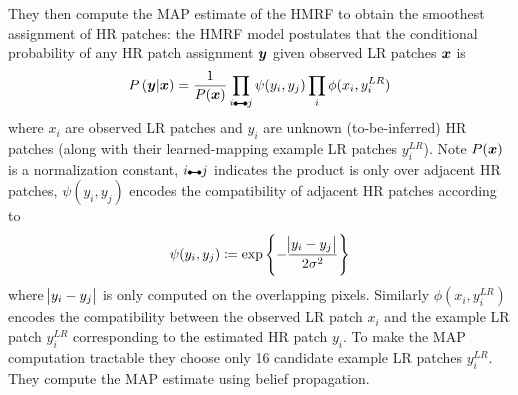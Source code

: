 %
They then compute the MAP estimate of the HMRF to obtain the smoothest assignment of HR patches: the HMRF model postulates that the conditional probability of any HR patch assignment \(\bm{y}\) given observed LR patches \(\bm{x}\) is
\begin{equation}
	P\left( \by \middle| \bx \right) = \frac{1}{P(\bx)} \prod_{i\ue{} j} \psi(y_i, y_j) \prod_i \phi(x_i, y_i^{LR})
\end{equation}
where \(x_i\) are observed LR patches and \(y_i\) are unknown (to-be-inferred) HR patches (along with their learned-mapping example LR patches \(y_i^{LR}\)).
%
Note \(P(\bm{x})\) is a normalization constant, \(i\ue{} j\) indicates the product is only over adjacent HR patches, \(\psi(y_i, y_j)\) encodes the compatibility of adjacent HR patches according to
\begin{equation}
	\psi(y_i, y_j) \coloneqq \exp \left\{ -  \frac{\abs{ y_i - y_j }}{2\sigma^2} \right\}
\end{equation}
where \(\abs{ y_i - y_j }\) is only computed on the overlapping pixels.
%
Similarly \(\phi(x_i, y_i^{LR})\) encodes the compatibility between the observed LR patch \(x_i\) and the example LR patch \(y_i^{LR}\) corresponding to the estimated HR patch \(y_i\).
%
To make the MAP computation tractable they choose only 16 candidate example LR patches \(y_i^{LR}\).
%
They compute the MAP estimate using belief propagation.

